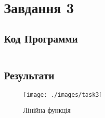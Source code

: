 \section{Завдання 3}
\label{sec:task3}

\subsection{Код Программи}
\label{subsec:task3_code}
\inputminted{python}{../src/task3.py}

\subsection{Результати}
\label{subsec:task3_results}

\begin{figure}[!ht]
    \centering
    \texttt{[image: ./images/task3]}
    \caption{Лінійна функція}
    \label{fig:linear_function}
\end{figure}
